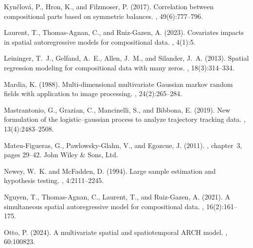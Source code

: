 \documentclass[12pt]{article}
\theoremstyle{plain}
\theoremstyle{definition}
\begin{document}
\begin{thebibliography}{}
	Kyn{\v{c}}lov{\'a}, P., Hron, K., and Filzmoser, P. (2017).
	\newblock Correlation between compositional parts based on symmetric balances.
	, 49(6):777--796.
	
	Laurent, T., Thomas-Agnan, C., and Ruiz-Gazen, A. (2023).
	\newblock Covariates impacts in spatial autoregressive models for compositional
	data.
	, 4(1):5.
	
	Leininger, T.~J., Gelfand, A.~E., Allen, J.~M., and Silander, J.~A. (2013).
	\newblock Spatial regression modeling for compositional data with many zeros.
	, 18(3):314--334.
	
	Mardia, K. (1988).
	\newblock Multi-dimensional multivariate {Gaussian} markov random fields with
	application to image processing.
	, 24(2):265--284.
	
	Mastrantonio, G., Grazian, C., Mancinelli, S., and Bibbona, E. (2019).
	\newblock New formulation of the logistic–gaussian process to analyze
	trajectory tracking data.
	, 13(4):2483--2508.
	
	{Mateu{-}Figueras}, G., {Pawlowsky{-}Glahn}, V., and Egozcue, J. (2011).
	, chapter~3, pages
	29--42.
	\newblock John Wiley \& Sons, Ltd.
	
	Newey, W.~K. and McFadden, D. (1994).
	\newblock Large sample estimation and hypothesis testing.
	, 4:2111--2245.
	
	Nguyen, T., Thomas-Agnan, C., Laurent, T., and Ruiz-Gazen, A. (2021).
	\newblock A simultaneous spatial autoregressive model for compositional data.
	, 16(2):161--175.
	
	Otto, P. (2024).
	\newblock A multivariate spatial and spatiotemporal {ARCH} model.
	, 60:100823.
	

\end{thebibliography}
\end{document}
